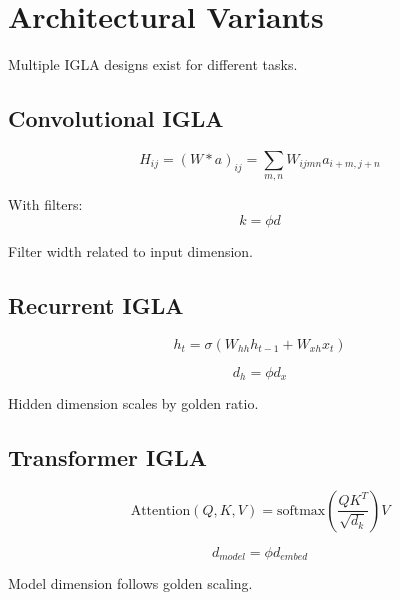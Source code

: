 \section{Architectural Variants}

Multiple IGLA designs exist for different tasks.

\subsection{Convolutional IGLA}

\begin{definition}[CIGLA]
\label{def:cigla}
\begin{equation}
H_{ij} = (W * a)_{ij} = \sum_{m,n} W_{ijmn} a_{i+m,j+n}
\end{equation}

With filters:
\begin{equation}
k = \phi d
\end{equation}

Filter width related to input dimension.
\end{definition}

\subsection{Recurrent IGLA}

\begin{equation}
h_t = \sigma(W_{hh} h_{t-1} + W_{xh} x_t)
\end{equation}

\begin{proposition}
\label{prop:golden-hidden}
\begin{equation}
d_h = \phi d_x
\end{equation}

Hidden dimension scales by golden ratio.
\end{proposition}

\subsection{Transformer IGLA}

\begin{equation}
\text{Attention}(Q,K,V) = \text{softmax}\left(\frac{QK^T}{\sqrt{d_k}}\right)V
\end{equation}

\begin{theorem}
\label{thm:golden-attention}
\begin{equation}
d_{model} = \phi d_{embed}
\end{equation}

Model dimension follows golden scaling.
\end{theorem}


